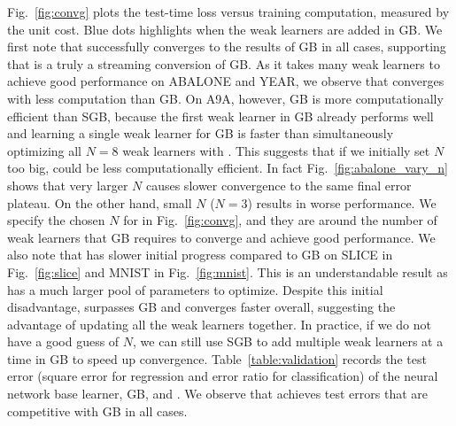 


Fig.~\ref{fig:convg} plots the test-time loss versus training computation, measured by the unit cost.
Blue dots highlights when the weak learners are added in GB. We first note that \algshort successfully converges to the results of GB in all cases, supporting that \algshort is a truly a streaming conversion of GB. 
As it takes many weak learners to achieve good performance on ABALONE and YEAR, we observe that \algshort converges with less computation than GB. On A9A, however, GB is more computationally efficient than SGB, because the first weak learner in GB already performs well and learning a single weak learner for GB is faster than simultaneously optimizing all $N=8$ weak learners with \algshort.  
This suggests that if we initially set $N$ too big, \algshort could be less computationally efficient. In fact Fig.~\ref{fig:abalone_vary_n} shows that very larger $N$ causes slower convergence to the same final error plateau. On the other hand, small $N$ ($N=3$) results in worse performance. 
We specify the chosen $N$ for \algshort in Fig.~\ref{fig:convg}, and they are around the number of weak learners that GB requires to converge and achieve good performance. 
We also note that \algshort has slower initial progress compared to GB on SLICE in Fig.~\ref{fig:slice} and MNIST in Fig.~\ref{fig:mnist}. This is an understandable result as \algshort has a much larger pool of parameters to optimize.
Despite this initial disadvantage, \algshort surpasses GB and converges faster overall, suggesting the advantage of updating all the weak learners together.
In practice, if we do not have a good guess of $N$, we can still use SGB to add multiple weak learners at a time in GB to speed up convergence. 
Table~\ref{table:validation} records the test error (square error for regression and error ratio for classification) of the neural network base learner, GB, and \algshort. We observe that \algshort achieves test errors that are competitive with GB in all cases. %

